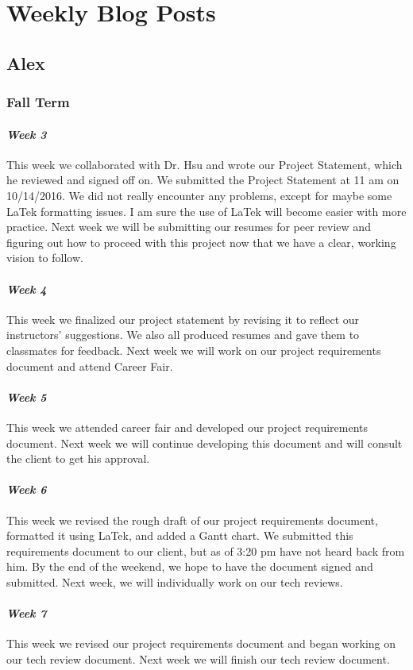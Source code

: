 \documentclass[onecolumn, draftclsnofoot,10pt, compsoc]{IEEEtran}
\begin{document}
\section{Weekly Blog Posts}
\subsection{Alex}
\subsubsection{Fall Term}
\paragraph{\emph{Week 3}}
This week we collaborated with Dr. Hsu and wrote our Project Statement, which he reviewed and signed off on. We submitted the Project Statement at 11 am on 10/14/2016. We did not really encounter any problems, except for maybe some LaTek formatting issues. I am sure the use of LaTek will become easier with more practice. Next week we will be submitting our resumes for peer review and figuring out how to proceed with this project now that we have a clear, working vision to follow.
\paragraph{\emph{Week 4}}
This week we finalized our project statement by revising it to reflect our instructors' suggestions. We also all produced resumes and gave them to classmates for feedback. Next week we will work on our project requirements document and attend Career Fair.
\paragraph{\emph{Week 5}}
This week we attended career fair and developed our project requirements document. Next week we will continue developing this document and will consult the client to get his approval.
\paragraph{\emph{Week 6}}
This week we revised the rough draft of our project requirements document, formatted it using LaTek, and added a Gantt chart. We submitted this requirements document to our client, but as of 3:20 pm have not heard back from him. By the end of the weekend, we hope to have the document signed and submitted. Next week, we will individually work on our tech reviews.
\paragraph{\emph{Week 7}}
This week we revised our project requirements document and began working on our tech review document. Next week we will finish our tech review document.
\end{document}
